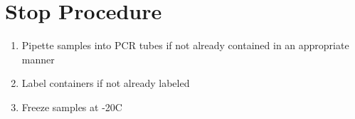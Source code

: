 \documentclass[letterpaper]{article}
\newcommand{\tdt}{Terminal Deoxynucleotidyl Transferase}
\newcommand{\C}{\degree{}C}
\newcommand{\BdATP}{3'-O-(2-nitrobenzyl)-2'-dATP}
\newcommand{\gel}[4]{
\begin{figure}[ht]
\label{#2}
\begin{center}
\texttt{[image: \#1]}
\caption{#2}
\end{center}
\subsection{#3 Analysis}
#4
\end{figure}
}
\begin{document}
\section*{Stop Procedure}
\begin{enumerate}
\item{Pipette samples into PCR tubes if not already contained in an appropriate manner}
\item{Label containers if not already labeled}
\item{Freeze samples at -20\C{}}
\end{enumerate}

\end{document}
